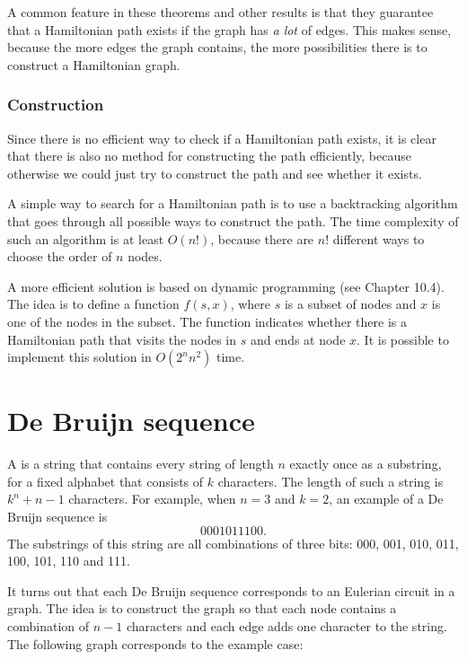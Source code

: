 A common feature in these theorems and other results is
that they guarantee that a Hamiltonian path exists
if the graph has \emph{a lot} of edges.
This makes sense, because the more edges the graph contains,
the more possibilities there is to construct a Hamiltonian graph.

\subsubsection{Construction}

Since there is no efficient way to check if a Hamiltonian
path exists, it is clear that there is also no method
for constructing the path efficiently, because otherwise
we could just try to construct the path and see
whether it exists.

A simple way to search for a Hamiltonian path is
to use a backtracking algorithm that goes through all
possible ways to construct the path.
The time complexity of such an algorithm is at least $O(n!)$,
because there are $n!$ different ways to choose the order of $n$ nodes.

A more efficient solution is based on dynamic programming
(see Chapter 10.4).
The idea is to define a function $f(s,x)$,
where $s$ is a subset of nodes and $x$
is one of the nodes in the subset.
The function indicates whether there is a Hamiltonian path
that visits the nodes in $s$ and ends at node $x$.
It is possible to implement this solution in $O(2^n n^2)$ time.

\section{De Bruijn sequence}


A  is a string that contains
every string of length $n$
exactly once as a substring, for a fixed
alphabet that consists of $k$ characters.
The length of such a string is 
$k^n+n-1$ characters.
For example, when $n=3$ and $k=2$,
an example of a De Bruijn sequence is
\[0001011100.\]
The substrings of this string are all
combinations of three bits:
000, 001, 010, 011, 100, 101, 110 and 111.

It turns out that each De Bruijn sequence
corresponds to an Eulerian circuit in a graph.
The idea is to construct the graph so that
each node contains a combination of $n-1$ characters
and each edge adds one character to the string.
The following graph corresponds to the example case:

